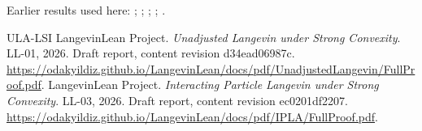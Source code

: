 \documentclass[11pt,a4paper]{article}
\begin{document}
Earlier results used here: \cite[Section~3.17.4]{LangevinLean2026ULASC}; \cite[Section~3.1.1]{LangevinLean2026IPLA}; \cite[Section~3.1.6]{LangevinLean2026IPLA}; \cite[Section~3.3.1]{LangevinLean2026IPLA}; \cite[Section~3.3.2]{LangevinLean2026IPLA}.

\begin{thebibliography}{ULA-LSI}
LangevinLean Project. \emph{Unadjusted Langevin under Strong Convexity}. LL-01, 2026. Draft report, content revision d34ead06987c. \url{https://odakyildiz.github.io/LangevinLean/docs/pdf/UnadjustedLangevin/FullProof.pdf}.
LangevinLean Project. \emph{Interacting Particle Langevin under Strong Convexity}. LL-03, 2026. Draft report, content revision ec0201df2207. \url{https://odakyildiz.github.io/LangevinLean/docs/pdf/IPLA/FullProof.pdf}.
\end{thebibliography}
\end{document}
